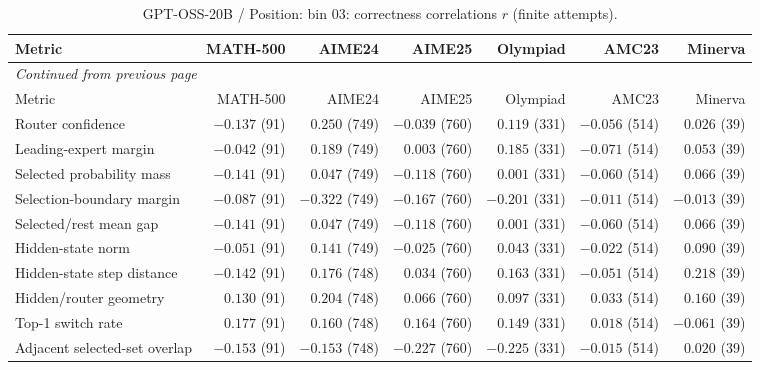 \begingroup\scriptsize\setlength{\tabcolsep}{4pt}
\begin{longtable}{@{}lrrrrrr@{}}
\caption{GPT-OSS-20B / Position: bin 03: correctness correlations $r$ (finite attempts).}\label{tab:multi-gptoss-position-bin_03}\\
\toprule
Metric & MATH-500 & AIME24 & AIME25 & Olympiad & AMC23 & Minerva \\
\midrule\endfirsthead
\multicolumn{7}{l}{\textit{Continued from previous page}}\\
\toprule
Metric & MATH-500 & AIME24 & AIME25 & Olympiad & AMC23 & Minerva \\
\midrule\endhead
\bottomrule\endfoot
Router confidence & $-0.137$ (91) & $0.250$ (749) & $-0.039$ (760) & $0.119$ (331) & $-0.056$ (514) & $0.026$ (39) \\
Leading-expert margin & $-0.042$ (91) & $0.189$ (749) & $0.003$ (760) & $0.185$ (331) & $-0.071$ (514) & $0.053$ (39) \\
Selected probability mass & $-0.141$ (91) & $0.047$ (749) & $-0.118$ (760) & $0.001$ (331) & $-0.060$ (514) & $0.066$ (39) \\
Selection-boundary margin & $-0.087$ (91) & $-0.322$ (749) & $-0.167$ (760) & $-0.201$ (331) & $-0.011$ (514) & $-0.013$ (39) \\
Selected/rest mean gap & $-0.141$ (91) & $0.047$ (749) & $-0.118$ (760) & $0.001$ (331) & $-0.060$ (514) & $0.066$ (39) \\
Hidden-state norm & $-0.051$ (91) & $0.141$ (749) & $-0.025$ (760) & $0.043$ (331) & $-0.022$ (514) & $0.090$ (39) \\
Hidden-state step distance & $-0.142$ (91) & $0.176$ (748) & $0.034$ (760) & $0.163$ (331) & $-0.051$ (514) & $0.218$ (39) \\
Hidden/router geometry & $0.130$ (91) & $0.204$ (748) & $0.066$ (760) & $0.097$ (331) & $0.033$ (514) & $0.160$ (39) \\
Top-1 switch rate & $0.177$ (91) & $0.160$ (748) & $0.164$ (760) & $0.149$ (331) & $0.018$ (514) & $-0.061$ (39) \\
Adjacent selected-set overlap & $-0.153$ (91) & $-0.153$ (748) & $-0.227$ (760) & $-0.225$ (331) & $-0.015$ (514) & $0.020$ (39) \\
\end{longtable}\endgroup

